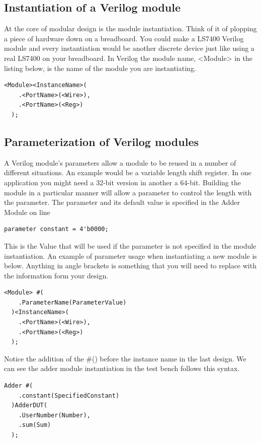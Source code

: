 \documentclass[12pt,journal]{IEEEtran}
\begin{document}
    \subsection{Instantiation of a Verilog module}
      At the core of modular design is the module instantiation. Think of it of plopping a piece of hardware down on a breadboard. You could make a LS7400 Verilog module and every instantiation would be another discrete device just like using a real LS7400 on your breadboard. In Verilog the module name, <Module> in the listing below, is the name of the module you are instantiating.
    \begin{lstlisting}[caption={Module instantiation template}]
<Module><InstanceName>(
    .<PortName>(<Wire>),
    .<PortName>(<Reg>)
  );
    \end{lstlisting}
    
    \subsection{Parameterization of Verilog modules}
      A Verilog module's parameters allow a module to be reused in a number of different situations. An example would be a variable length shift register. In one application you might need a 32-bit version in another a 64-bit. Building the module in a particular manner will allow a parameter to control the length with the parameter. The parameter and its default value is specified in the Adder Module on line
      \begin{lstlisting}
parameter constant = 4'b0000;
      \end{lstlisting}
      This is the Value that will be used if the parameter is not specified in the module instantiation. An example of parameter usage when instantiating a new module is below. Anything in angle brackets is something that you will need to replace with the information form your design.
    \begin{lstlisting}[caption={Module instantiation template with parameterization}]
<Module> #(
    .ParameterName(ParameterValue)
  )<InstanceName>(
    .<PortName>(<Wire>),
    .<PortName>(<Reg>)
  );
    \end{lstlisting}
    Notice the addition of the \#() before the instance name in the last design. We can see the adder module instantiation in the test bench follows this syntax.
    \begin{lstlisting}[caption={Module instantiation from Adder test bench}]
Adder #(
    .constant(SpecifiedConstant)
  )AdderDUT(
    .UserNumber(Number),
    .sum(Sum)
  );
    \end{lstlisting}
\end{document}
